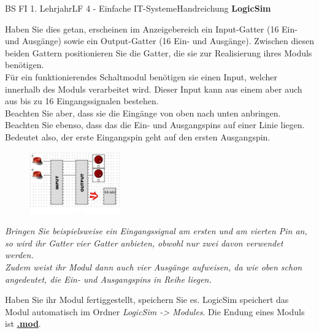 \documentclass[11pt,oneside,openany,headings=optiontotoc,11pt,numbers=noenddot]{article}
\begin{document}
\begin{worksheet}{BS FI 1. Lehrjahr}{LF 4 - Einfache IT-Systeme}{Handreichung \textbf{LogicSim}}
\begin{figure}
		\end{figure}
		Haben Sie dies getan, erscheinen im Anzeigebereich ein Input-Gatter (16 Ein- und Ausgänge)  sowie ein Output-Gatter (16 Ein- und Ausgänge). Zwischen diesen beiden Gattern positionieren Sie die Gatter, die sie zur Realisierung ihres Moduls benötigen.\\
		Für ein funktionierendes Schaltmodul benötigen sie einen Input, welcher innerhalb des Moduls verarbeitet wird. Dieser Input kann aus einem aber auch aus bis zu 16 Eingangssignalen bestehen.\\
		Beachten Sie aber, dass sie die Eingänge von oben nach unten anbringen.\\
		Beachten Sie ebenso, dass das die Ein- und Ausgangspins auf einer Linie liegen. Bedeutet also, der erste Eingangspin geht auf den ersten Ausgangspin.\\
		\par\noindent
		\begin{figure}
			\vspace{-25pt}
			\includegraphics[width=0.35\textwidth]{../99_Bilder/falseInOut.jpg}
		\end{figure}
		\small{\textit{Bringen Sie beispielsweise ein Eingangssignal am ersten und am vierten Pin an, so wird ihr Gatter vier Gatter anbieten, obwohl nur zwei davon verwendet werden.\\
		Zudem weist ihr Modul dann auch vier Ausgänge aufweisen, da wie oben schon angedeutet, die Ein- und Ausgangspins in Reihe liegen.}}\\
		\par\noindent
		Haben Sie ihr Modul fertiggestellt, speichern Sie es. LogicSim speichert das Modul automatisch im Ordner \textit{LogicSim -> Modules}. Die Endung eines Moduls ist \textbf{\underline{.mod}}.

\end{worksheet}
\end{document}
